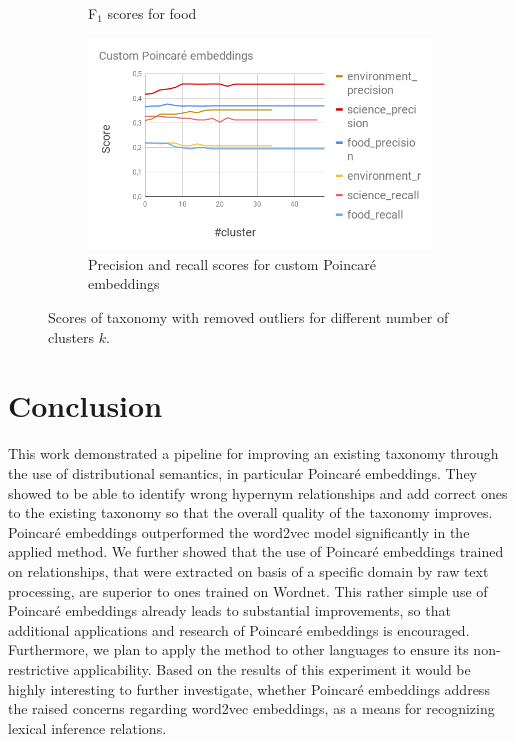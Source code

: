 \documentclass[12pt, headsepline, a4paper]{scrartcl}
\begin{document}
\begin{figure}[H]
\begin{subfigure}{0.50 \textwidth}
		\caption{F$_1$ scores for food}
	\end{subfigure}
	\begin{subfigure}{0.50 \textwidth}
		\includegraphics[width=1\textwidth]{images/Custom_Poincare_embeddings.png}
		\caption{Precision and recall scores for custom Poincaré embeddings}
		\label{precision_score}
	\end{subfigure}
	\caption{Scores of taxonomy with removed outliers for different number of clusters $k$.}
	\label{outlier_clusters}
\end{figure}


	

\section{Conclusion}

This work demonstrated a pipeline for improving an existing taxonomy through the use of distributional semantics, in particular Poincaré embeddings. They showed to be able to identify wrong hypernym relationships and add correct ones to the existing taxonomy so that the overall quality of the taxonomy improves. Poincaré embeddings outperformed the word2vec model significantly in the applied method. We further showed that the use of Poincaré embeddings trained on relationships, that were extracted on basis of a specific domain by raw text processing, are superior to ones trained on Wordnet. This rather simple use of Poincaré embeddings already leads to substantial improvements, so that additional applications and research of Poincaré embeddings is encouraged. Furthermore, we plan to apply the method to other languages to ensure its non-restrictive applicability. Based on the results of this experiment it would be highly interesting to further investigate, whether Poincaré embeddings address the raised concerns regarding word2vec embeddings, as a means for recognizing lexical inference relations.
\end{document}
